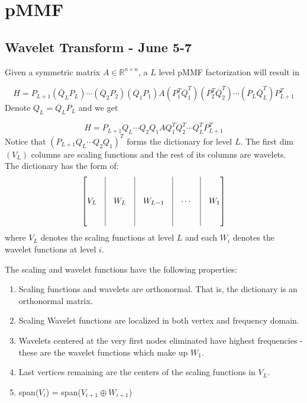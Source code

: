 \documentclass[a4paper]{article}
\newcommand{\R}{\mathbb{R}}
\begin{document}
\section{pMMF}
\subsection{Wavelet Transform - June 5-7}

Given a symmetric matrix $A \in \R^{n\times n}$, a $L$ level pMMF factorization will result in 

$$H = P_{L+1} (\overline{Q}_L P_L) \cdots (\overline{Q}_2 P_2) (\overline{Q}_1 P_1) A (P_1^{T} \overline{Q}_1^{T}) (P_2^{T} \overline{Q}_2^T) \cdots (P_{L} \overline{Q}_L^{T}) P_{L+1}^T$$
Denote $Q_L = \overline{Q}_L P_L$ and we get

$$H = P_{L+1} Q_L \cdots Q_2 Q_1 A Q_1^T Q_2^T \cdots Q_L^T P_{L+1}^T$$
Notice that $(P_{L+1} Q_L \cdots Q_2 Q_1)^T$ forms the dictionary for level $L$. The first dim$(V_L)$ columns are scaling functions and the rest of its columns are wavelets. The dictionary has the form of:
\[\begin{bmatrix}
& \vline & & \vline & & \vline & & \vline  \\
& \vline & & \vline & & \vline & & \vline \\
V_L & \vline & W_L & \vline & W_{L-1} & \vline & \cdots & \vline & W_1  \\
& \vline & & \vline & & \vline & & \vline \\
& \vline & & \vline & & \vline & & \vline \\
\end{bmatrix}\]
where $V_L$ denotes the scaling functions at level $L$ and each $W_i$ denotes the wavelet functions at level $i$.

\smallskip
The scaling and  wavelet functions have the following properties:
\begin{enumerate}
\item Scaling functions and wavelets are orthonormal. That is, the dictionary is an orthonormal matrix.
\item Scaling Wavelet functions are localized in both vertex and frequency domain.
\item Wavelets centered at the very first nodes eliminated have highest frequencies - these are the wavelet functions which make up $W_1$.
\item Last vertices remaining are the centers of the scaling functions in $V_L$.
\item span($V_i$) = span($V_{i+1} \oplus W_{i+1}$)
\end{enumerate}
\end{document}
